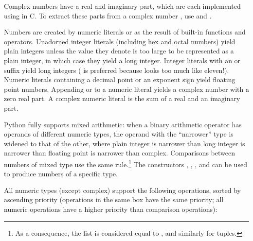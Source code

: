 Complex numbers have a real and imaginary part, which are each
implemented using  in C.  To extract these parts from
a complex number , use  and .

Numbers are created by numeric literals or as the result of built-in
functions and operators.  Unadorned integer literals (including hex
and octal numbers) yield plain integers unless the value they denote
is too large to be represented as a plain integer, in which case
they yield a long integer.  Integer literals with an
 or  suffix yield long integers
( is preferred because  looks too much like
eleven!).  Numeric literals containing a decimal point or an exponent
sign yield floating point numbers.  Appending  or
 to a numeric literal yields a complex number with a
zero real part. A complex numeric literal is the sum of a real and
an imaginary part.

Python fully supports mixed arithmetic: when a binary arithmetic
operator has operands of different numeric types, the operand with the
``narrower'' type is widened to that of the other, where plain
integer is narrower than long integer is narrower than floating point is
narrower than complex.
Comparisons between numbers of mixed type use the same rule.\footnote{
	As a consequence, the list \code{[1, 2]} is considered equal
        to \code{[1.0, 2.0]}, and similarly for tuples.
} The constructors , , ,
and  can be used
to produce numbers of a specific type.

All numeric types (except complex) support the following operations,
sorted by ascending priority (operations in the same box have the same
priority; all numeric operations have a higher priority than
comparison operations):

